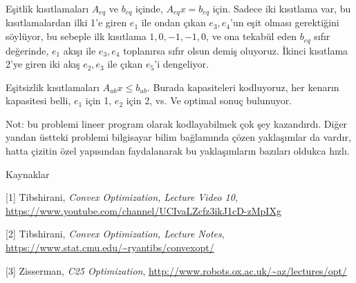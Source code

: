 \documentclass[12pt,fleqn]{article}\usepackage{../../common}
\begin{document}
Eşitlik kısıtlamaları $A_{eq}$ ve $b_{eq}$ içinde, $A_{eq}x = b_{eq}$ için.
Sadece iki kısıtlama var, bu kısıtlamalardan ilki 1'e giren $e_1$ ile ondan
çıkan $e_3,e_4$'un eşit olması gerektiğini söylüyor, bu sebeple ilk
kısıtlama $1,0,-1,-1,0$, ve ona tekabül eden $b_{eq}$ sıfır değerinde,
$e_1$ akışı ile $e_3,e_4$ toplanırsa sıfır olsun demiş oluyoruz. İkinci
kısıtlama 2'ye giren iki akış $e_2,e_3$ ile çıkan $e_5$'i dengeliyor.

Eşitsizlik kısıtlamaları $A_{ub}x \le b_{ub}$. Burada kapasiteleri
kodluyoruz, her kenarın kapasitesi belli, $e_1$ için 1, $e_2$ için 2, vs.
Ve optimal sonuç bulunuyor.

Not: bu problemi lineer program olarak kodlayabilmek çok şey
kazandırdı. Diğer yandan üstteki problemi bilgisayar bilim bağlamında çözen
yaklaşımlar da vardır, hatta çizitin özel yapısından faydalanarak bu
yaklaşımların bazıları oldukca hızlı.

Kaynaklar

[1] Tibshirani, {\em Convex Optimization, Lecture Video 10}, 
\url{https://www.youtube.com/channel/UCIvaLZcfz3ikJ1cD-zMpIXg}   

[2] Tibshirani, {\em Convex Optimization, Lecture Notes}, 
\url{https://www.stat.cmu.edu/~ryantibs/convexopt/}

[3] Zisserman, {\em C25 Optimization}, 
\url{http://www.robots.ox.ac.uk/~az/lectures/opt/}   
\end{document}
